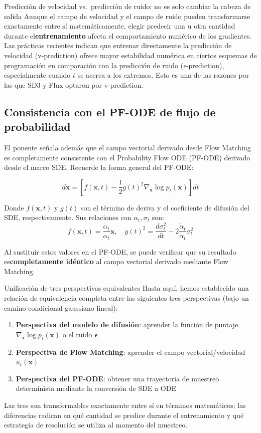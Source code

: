 \begin{warningbox}{Predicción de velocidad vs.\ predicción de ruido: no es solo cambiar la cabeza de salida}
Aunque el campo de velocidad y el campo de ruido pueden transformarse exactamente entre sí matemáticamente, elegir predecir una u otra cantidad durante el\textbf{entrenamiento} afecta el comportamiento numérico de los gradientes. Las prácticas recientes indican que entrenar directamente la predicción de velocidad (v-prediction) ofrece mayor estabilidad numérica en ciertos esquemas de programación en comparación con la predicción de ruido ($\epsilon$-prediction), especialmente cuando $t$ se acerca a los extremos. Esto es una de las razones por las que SD3 y Flux optaron por v-prediction.
\end{warningbox}

\subsection{Consistencia con el PF-ODE de flujo de probabilidad}

El ponente señala además que el campo vectorial derivado desde Flow Matching es completamente consistente con el Probability Flow ODE (PF-ODE) derivado desde el marco SDE. Recuerde la forma general del PF-ODE:

$$d\mathbf{x} = \left[f(\mathbf{x}, t) - \frac{1}{2}g(t)^2 \nabla_\mathbf{x} \log p_t(\mathbf{x})\right] dt$$

Donde $f(\mathbf{x}, t)$ y $g(t)$ son el término de deriva y el coeficiente de difusión del SDE, respectivamente. Sus relaciones con $\alpha_t, \sigma_t$ son:
$$f(\mathbf{x}, t) = \frac{\dot{\alpha}_t}{\alpha_t} \mathbf{x}, \quad g(t)^2 = \frac{d\sigma_t^2}{dt} - 2\frac{\dot{\alpha}_t}{\alpha_t}\sigma_t^2$$

Al sustituir estos valores en el PF-ODE, se puede verificar que su resultado es\textbf{completamente idéntico} al campo vectorial derivado mediante Flow Matching.

\begin{importantbox}{Unificación de tres perspectivas equivalentes}
Hasta aquí, hemos establecido una relación de equivalencia completa entre las siguientes tres perspectivas (bajo un camino condicional gaussiano lineal):
\begin{enumerate}
    \item \textbf{Perspectiva del modelo de difusión}: aprender la función de puntaje $\nabla_\mathbf{x} \log p_t(\mathbf{x})$ o el ruido $\boldsymbol{\epsilon}$
    \item \textbf{Perspectiva de Flow Matching}: aprender el campo vectorial/velocidad $u_t(\mathbf{x})$
    \item \textbf{Perspectiva del PF-ODE}: obtener una trayectoria de muestreo determinista mediante la conversión de SDE a ODE
\end{enumerate}
Las tres son transformables exactamente entre sí en términos matemáticos; las diferencias radican en qué cantidad se predice durante el entrenamiento y qué estrategia de resolución se utiliza al momento del muestreo.
\end{importantbox}

